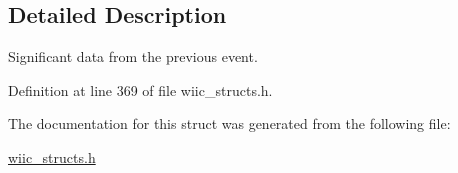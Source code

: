 \subsection{\-Detailed \-Description}
\-Significant data from the previous event. 

\-Definition at line 369 of file wiic\-\_\-structs.\-h.



\-The documentation for this struct was generated from the following file\-:\begin{DoxyCompactItemize}
\item 
\hyperlink{wiic__structs_8h}{wiic\-\_\-structs.\-h}\end{DoxyCompactItemize}
